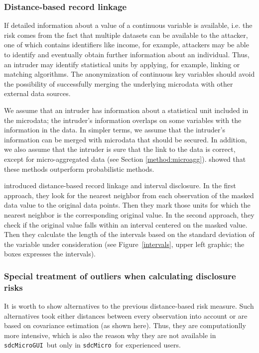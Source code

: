 \documentclass[12pt]{scrartcl}\usepackage[]{graphicx}\usepackage[]{color}
\newcommand{\sdcMicro}{\texttt{sdcMicro}}
\newcommand{\sdcMicroGUI}{\texttt{sdcMicroGUI}}
\begin{document}
\subsubsection{Distance-based record linkage}
If detailed information about a value of a continuous variable is available, i.e. the risk comes from the fact that multiple datasets can be available to the attacker, one of which contains identifiers like income, for example, attackers may be able to identify and eventually obtain further information about an individual. Thus, an intruder may identify statistical units by applying, for example, linking or matching algorithms. The anonymization of continuous key variables should avoid the possibility of successfully merging the underlying microdata with other external data sources.

We assume that an intruder has information about a statistical unit included in the microdata; the intruder's information overlaps on some variables with the information in the data. In simpler terms, we assume that the intruder's information can be merged with microdata that should be secured. In addition, we also assume that the intruder is sure that the link to the data is correct, except for micro-aggregated data   (see Section \ref{method:microagg}). \cite{Domingo01} showed that these methods outperform probabilistic methods.

\cite{Mateo04} introduced distance-based record linkage and interval disclosure. In the first approach, they look for the nearest neighbor from each observation of the masked data value to the original data points. Then they mark those units for which the nearest neighbor is the corresponding original value. In the second approach, they check if the original value falls within an interval centered on the masked value. Then they calculate the length of the intervals based on the standard deviation of the variable under consideration (see Figure~\ref{intervals},  upper left graphic; the boxes expresses the intervals).

\subsubsection{Special treatment of outliers when calculating disclosure risks} \label{secOut}
It is worth to show alternatives to the previous distance-based risk measure. Such alternatives took either distances between every observation into account or are based on covariance estimation (as shown here). Thus, they are computationlly more intensive, which is also the reason why they are not available in \sdcMicroGUI \ but only in \sdcMicro \ for experienced users.
\end{document}
